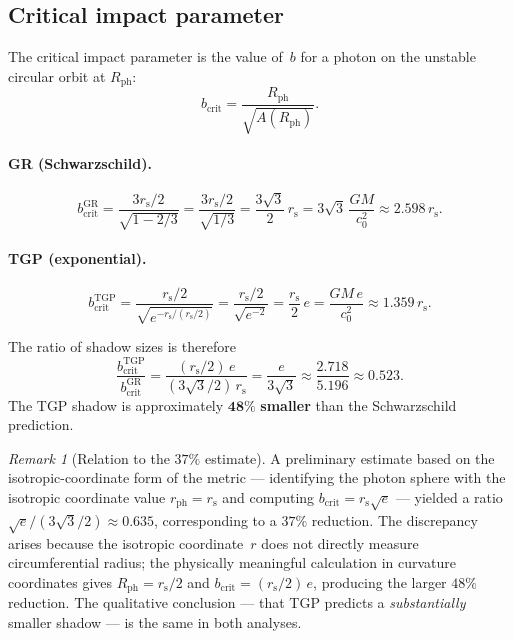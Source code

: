 \documentclass[11pt,a4paper]{article}
\theoremstyle{definition}
\theoremstyle{remark}
\newtheorem{remark}[theorem]{Remark}
\newcommand{\rs}{r_{\mathrm{s}}}
\newcommand{\bcrit}{b_{\mathrm{crit}}}
\begin{document}
\subsection{Critical impact parameter}\label{ssec:bcrit}

The critical impact parameter is the value of~$b$ for a photon on the
unstable circular orbit at $R_{\mathrm{ph}}$:
\begin{equation}\label{eq:bcrit-formula}
  \bcrit = \frac{R_{\mathrm{ph}}}{\sqrt{A(R_{\mathrm{ph}})}}.
\end{equation}

\paragraph{GR (Schwarzschild).}
\begin{equation}\label{eq:bcrit-GR-full}
  \bcrit^{\mathrm{GR}}
  = \frac{3\rs/2}{\sqrt{1 - 2/3}}
  = \frac{3\rs/2}{\sqrt{1/3}}
  = \frac{3\sqrt{3}}{2}\,\rs
  = 3\sqrt{3}\,\frac{GM}{c_0^2}
  \approx 2.598\,\rs.
\end{equation}

\paragraph{TGP (exponential).}
\begin{equation}\label{eq:bcrit-TGP}
  \bcrit^{\mathrm{TGP}}
  = \frac{\rs/2}{\sqrt{e^{-\rs/(\rs/2)}}}
  = \frac{\rs/2}{\sqrt{e^{-2}}}
  = \frac{\rs}{2}\,e
  = \frac{GM\,e}{c_0^2}
  \approx 1.359\,\rs.
\end{equation}

The ratio of shadow sizes is therefore
\begin{equation}\label{eq:ratio}
  \boxed{
    \frac{\bcrit^{\mathrm{TGP}}}{\bcrit^{\mathrm{GR}}}
    = \frac{(\rs/2)\,e}{(3\sqrt{3}/2)\,\rs}
    = \frac{e}{3\sqrt{3}}
    \approx \frac{2.718}{5.196}
    \approx 0.523.
  }
\end{equation}
The TGP shadow is approximately $\mathbf{48\%}$ \textbf{smaller} than
the Schwarzschild prediction.

\begin{remark}[Relation to the $37\%$ estimate]\label{rem:37pct}
A preliminary estimate based on the isotropic-coordinate form of the
metric --- identifying the photon sphere with the isotropic coordinate
value $r_{\mathrm{ph}} = \rs$ and computing $\bcrit = \rs\sqrt{e}$ ---
yielded a ratio $\sqrt{e}/(3\sqrt{3}/2) \approx 0.635$, corresponding
to a $37\%$ reduction.  The discrepancy arises because the isotropic
coordinate~$r$ does not directly measure circumferential radius; the
physically meaningful calculation in curvature coordinates gives
$R_{\mathrm{ph}} = \rs/2$ and $\bcrit = (\rs/2)\,e$, producing the
larger $48\%$ reduction.  The qualitative conclusion --- that TGP
predicts a \emph{substantially} smaller shadow --- is the same in both
analyses.
\end{remark}
\end{document}
